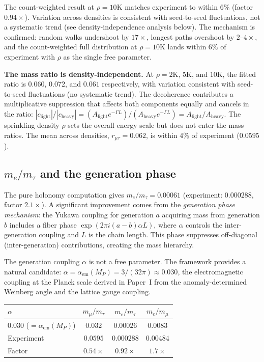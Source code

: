 \documentclass[11pt,letterpaper]{article}
\begin{document}
\noindent The count-weighted result at $\rho = 10$K matches experiment
to within $6\%$ (factor $0.94\times$).  Variation across densities
is consistent with seed-to-seed fluctuations, not a systematic trend
(see density-independence analysis below).
The mechanism is confirmed: random walks undershoot by $17\times$,
longest paths overshoot by $2$--$4\times$, and the count-weighted
full distribution at $\rho = 10$K lands within $6\%$ of experiment
with $\rho$ as the single free parameter.

\noindent\textbf{The mass ratio is density-independent.}
At $\rho = 2$K, $5$K, and $10$K, the fitted ratio is $0.060$,
$0.072$, and $0.061$ respectively, with variation consistent with
seed-to-seed fluctuations (no systematic trend).  The decoherence
contributes a multiplicative suppression that affects both
components equally and cancels in the ratio:
$|c_{\mathrm{light}}|/|c_{\mathrm{heavy}}|
= (A_{\mathrm{light}} e^{-\Gamma L}) / (A_{\mathrm{heavy}} e^{-\Gamma L})
= A_{\mathrm{light}}/A_{\mathrm{heavy}}$.
The sprinkling density $\rho$ sets the overall energy scale but
does not enter the mass ratios.  The mean across densities,
$r_{\mu\tau} = 0.062$, is within 4\% of experiment ($0.0595$).

\subsection{$m_e/m_\tau$ and the generation phase}

The pure holonomy computation gives $m_e/m_\tau = 0.00061$
(experiment: $0.000288$, factor $2.1\times$).  A significant
improvement comes from the \emph{generation phase mechanism}: the
Yukawa coupling for generation $a$ acquiring mass from generation $b$
includes a fiber phase $\exp(2\pi i (a-b) \alpha L)$, where $\alpha$
controls the inter-generation coupling and $L$ is the chain length.
This phase suppresses off-diagonal (inter-generation) contributions,
creating the mass hierarchy.

The generation coupling $\alpha$ is not a free parameter.  The
framework provides a natural candidate: $\alpha = \alpha_{\mathrm{em}}
(M_P) = 3/(32\pi) \approx 0.030$, the electromagnetic coupling at
the Planck scale derived in Paper~I from the anomaly-determined
Weinberg angle and the lattice gauge coupling.

\begin{center}
\begin{tabular}{@{}lccc@{}}
\toprule
$\alpha$ & $m_\mu/m_\tau$ & $m_e/m_\tau$ & $m_e/m_\mu$ \\
\midrule
$0.030$ ($= \alpha_{\mathrm{em}}(M_P)$) &
  $0.032$ & $0.00026$ & $0.0083$ \\
Experiment & $0.0595$ & $0.000288$ & $0.00484$ \\
Factor & $0.54\times$ & $0.92\times$ & $1.7\times$ \\
\bottomrule
\end{tabular}
\end{center}
\end{document}
